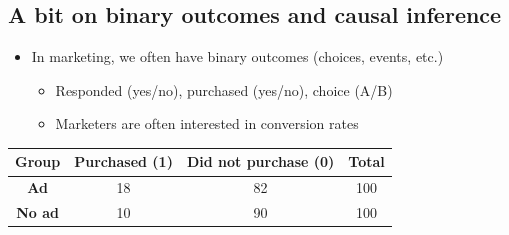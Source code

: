 \documentclass[10pt]{article}
\begin{document}
\subsection{A bit on binary outcomes and causal inference}
\begin{itemize}
    \item In marketing, we often have binary outcomes (choices, events, etc.)
    \begin{itemize}
        \item Responded (yes/no), purchased (yes/no), choice (A/B)
        \item Marketers are often interested in conversion rates
    \end{itemize}
\end{itemize}

\begin{center}
    \begin{tabular}{|c|c|c|c|}
        \hline 
        \textbf{Group} & \textbf{Purchased (1)} & \textbf{Did not purchase (0)} & \textbf{Total}\\\hline 
        \textbf{Ad} & 18 & 82 & 100\\\hline 
        \textbf{No ad} & 10 & 90 & 100\\\hline 
    \end{tabular}
\end{center}
\end{document}
